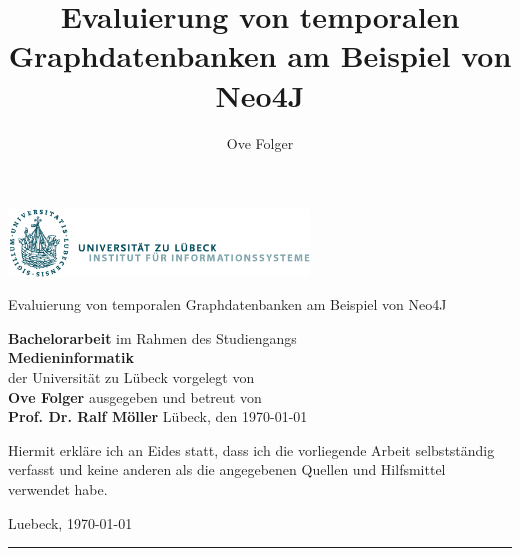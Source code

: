 \documentclass[
11pt, %
ngerman, %
singlespacing, %
headsepline, %
]{MastersDoctoralThesis} %
\author{Ove Folger} %
\begin{document}
\frontmatter %

\pagestyle{plain} %


\begin{titlepage}

	\Large
	\title{Evaluierung von temporalen Graphdatenbanken am Beispiel von Neo4J }
	\includegraphics[width=8cm]{Figures/ifis_logo.png}
	\vskip 44pt
		{\LARGE Evaluierung von temporalen Graphdatenbanken am Beispiel von Neo4J \par}
		\vskip 20pt
		\textbf{Bachelorarbeit}
		\vskip 20pt
		im Rahmen des Studiengangs \\
		\textbf{Medieninformatik} \\
		der Universität zu Lübeck
		\vskip 20pt
		vorgelegt von \\
		\textbf{Ove Folger}
		\vskip 20pt
		ausgegeben und betreut von \\
		\textbf{Prof. Dr. Ralf Möller}
		\vfill
		Lübeck, den \today
		\vskip 20pt


\end{titlepage}

\begin{declaration}
	\addchaptertocentry{\authorshipname} %
	\bigskip\noindent Hiermit erkl{\"a}re ich an Eides statt, dass
	ich die vorliegende Arbeit selbst\-st{\"a}n\-dig verfasst und keine
	anderen als die angegebenen Quellen und Hilfsmittel verwendet habe.\par
	\bigskip\noindent Luebeck, \today
	\vskip 10mm
	\hfill\rule{18em}{.3pt}%
\end{declaration}





\end{document}
